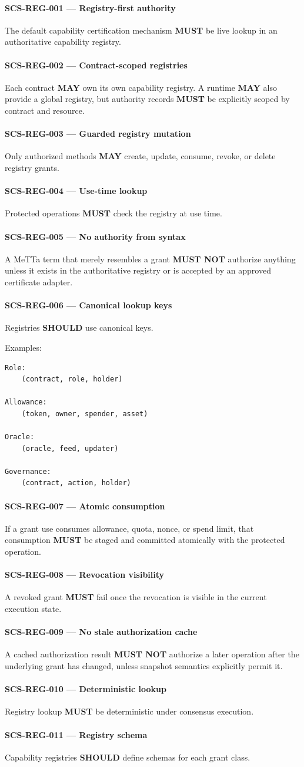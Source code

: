 \documentclass[11pt]{article}
\newcommand{\MeTTa}{MeTTa}
\newcommand{\MUST}{\textbf{MUST}}
\newcommand{\MUSTNOT}{\textbf{MUST NOT}}
\newcommand{\SHOULD}{\textbf{SHOULD}}
\newcommand{\MAY}{\textbf{MAY}}
\newcommand{\req}[2]{\paragraph{#1}#2\par}
\begin{document}
\req{SCS-REG-001 --- Registry-first authority}{The default capability certification mechanism \MUST{} be live lookup in an authoritative capability registry.}

\req{SCS-REG-002 --- Contract-scoped registries}{Each contract \MAY{} own its own capability registry. A runtime \MAY{} also provide a global registry, but authority records \MUST{} be explicitly scoped by contract and resource.}

\req{SCS-REG-003 --- Guarded registry mutation}{Only authorized methods \MAY{} create, update, consume, revoke, or delete registry grants.}

\req{SCS-REG-004 --- Use-time lookup}{Protected operations \MUST{} check the registry at use time.}

\req{SCS-REG-005 --- No authority from syntax}{A \MeTTa{} term that merely resembles a grant \MUSTNOT{} authorize anything unless it exists in the authoritative registry or is accepted by an approved certificate adapter.}

\req{SCS-REG-006 --- Canonical lookup keys}{Registries \SHOULD{} use canonical keys.}

Examples:

\begin{lstlisting}
Role:
    (contract, role, holder)

Allowance:
    (token, owner, spender, asset)

Oracle:
    (oracle, feed, updater)

Governance:
    (contract, action, holder)
\end{lstlisting}

\req{SCS-REG-007 --- Atomic consumption}{If a grant use consumes allowance, quota, nonce, or spend limit, that consumption \MUST{} be staged and committed atomically with the protected operation.}

\req{SCS-REG-008 --- Revocation visibility}{A revoked grant \MUST{} fail once the revocation is visible in the current execution state.}

\req{SCS-REG-009 --- No stale authorization cache}{A cached authorization result \MUSTNOT{} authorize a later operation after the underlying grant has changed, unless snapshot semantics explicitly permit it.}

\req{SCS-REG-010 --- Deterministic lookup}{Registry lookup \MUST{} be deterministic under consensus execution.}

\req{SCS-REG-011 --- Registry schema}{Capability registries \SHOULD{} define schemas for each grant class.}
\end{document}

